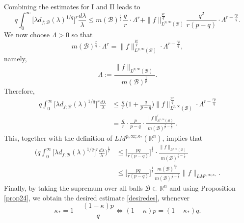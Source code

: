 \documentclass{birkjour}
\theoremstyle{definition}
\theoremstyle{remark}
\numberwithin{equation}{section}
\begin{document}
Combining the estimates for $\mathrm{I}$ and $\mathrm{II}$ leads to
\begin{equation*}
q\int_0^{\infty}\Big[\lambda d_{f;\mathcal{B}}(\lambda)^{1/q}\Big]^r\frac{d\lambda}{\lambda}
\leq m(\mathcal{B})^{\frac{r}{q}}\frac{q}{\,r\,}\cdot\Lambda^r
+\|f\|_{L^{p,\infty}(\mathcal{B})}^{\frac{pr}{q}}\frac{q^2}{r(p-q)}\cdot\Lambda^{r-\frac{rp}{q}}.
\end{equation*}
We now choose $\Lambda>0$ so that
\begin{equation*}
m(\mathcal{B})^{\frac{r}{q}}\cdot\Lambda^r=\|f\|_{L^{p,\infty}(\mathcal{B})}^{\frac{pr}{q}}\cdot\Lambda^{r-\frac{rp}{q}},
\end{equation*}
namely,
\begin{equation*}
\Lambda:=\frac{\|f\|_{L^{p,\infty}(\mathcal{B})}}{m(\mathcal{B})^{\frac{1}{p}}}.
\end{equation*}
Therefore,
\begin{equation*}
\begin{split}
q\int_0^{\infty}\Big[\lambda d_{f;\mathcal{B}}(\lambda)^{1/q}\Big]^r\frac{d\lambda}{\lambda}
&\leq \frac{q}{\,r\,}\Big(1+\frac{q}{p-q}\Big)\|f\|_{L^{p,\infty}(\mathcal{B})}^{\frac{pr}{q}}\cdot\Lambda^{r-\frac{rp}{q}}\\
&=\frac{q}{\,r\,}\cdot\frac{p}{p-q}
\cdot\frac{\|f\|^r_{L^{p,\infty}(\mathcal{B})}}{m(\mathcal{B})^{\frac{r}{p}-\frac{r}{q}}}.
\end{split}
\end{equation*}
This, together with the definition of $LM^{p,\infty;\kappa_{*}}(\mathbb R^n)$, implies that
\begin{equation*}
\begin{split}
\bigg(q\int_0^{\infty}\Big[\lambda d_{f;\mathcal{B}}(\lambda)^{1/q}\Big]^r\frac{d\lambda}{\lambda}\bigg)^{\frac{1}{r}}
&\leq\Big[\frac{pq}{r(p-q)}\Big]^{\frac{1}{r}}
\cdot\frac{\|f\|_{L^{p,\infty}(\mathcal{B})}}{m(\mathcal{B})^{\frac{1}{p}-\frac{1}{q}}}\\
&\leq\Big[\frac{pq}{r(p-q)}\Big]^{\frac{1}{r}}
\frac{m(\mathcal{B})^{\frac{\kappa_{*}}{p}}}{m(\mathcal{B})^{\frac{1}{p}-\frac{1}{q}}}\|f\|_{LM^{p,\infty;\kappa_{*}}}.
\end{split}
\end{equation*}
Finally, by taking the supremum over all balls $\mathcal{B}\subset\mathbb R^n$ and using Proposition \ref{prop24}, we obtain the desired estimate \eqref{desiredes}, whenever
\begin{equation*}
\kappa_*=1-\frac{(1-\kappa)p}{q}\Longleftrightarrow(1-\kappa)p=(1-\kappa_*)q.
\end{equation*}  
\end{document}
